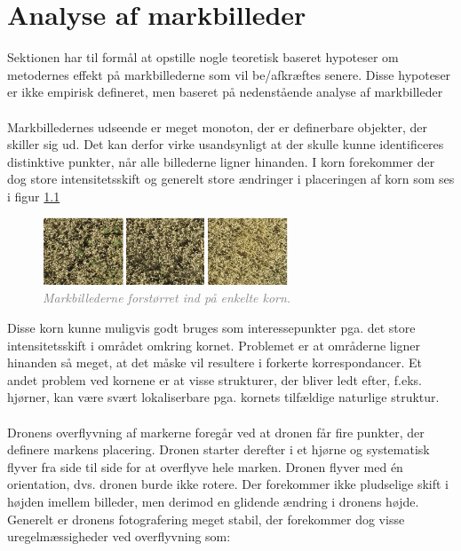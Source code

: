 \chapter{Analyse af markbilleder} \label{sec:mark}
Sektionen har til formål at opstille nogle teoretisk baseret hypoteser om metodernes effekt på markbillederne som vil be/afkræftes senere. Disse hypoteser er ikke empirisk defineret, men baseret på nedenstående analyse af markbilleder \\ \\
Markbilledernes udseende er meget monoton, der er definerbare objekter, der skiller sig ud. Det kan derfor virke usandsynligt at der skulle kunne identificeres distinktive punkter, når alle billederne ligner hinanden. I korn forekommer der dog store intensitetsskift og generelt store ændringer i placeringen af korn som ses i figur \ref{fig:korn}
\begin{figure}[H]
    \centering
    \includegraphics[width=0.65\textwidth]{fig/20.png}
     \vspace{-1em}
    \begin{center}    
       \caption{\textcolor{gray}{\footnotesize \textit{Markbillederne forstørret ind på enkelte korn.}}}
    \label{fig:korn}
     \end{center}
     \vspace{-2.5em}
  \end{figure} \noindent
Disse korn kunne muligvis godt bruges som interessepunkter pga. det store intensitetsskift i området omkring kornet. Problemet er at områderne ligner hinanden så meget, at det måske vil resultere i forkerte korrespondancer. Et andet problem ved kornene er at visse strukturer, der bliver ledt efter, f.eks. hjørner, kan være svært lokaliserbare pga. kornets tilfældige naturlige struktur. \\ \\
Dronens overflyvning af markerne foregår ved at dronen får fire punkter, der definere markens placering. Dronen starter derefter i et hjørne og systematisk flyver fra side til side for at overflyve hele marken. Dronen flyver med én orientation, dvs. dronen burde ikke rotere. Der forekommer ikke pludselige skift i højden imellem billeder, men derimod en glidende ændring i dronens højde. Generelt er dronens fotografering meget stabil, der forekommer dog visse uregelmæssigheder ved overflyvning som:
